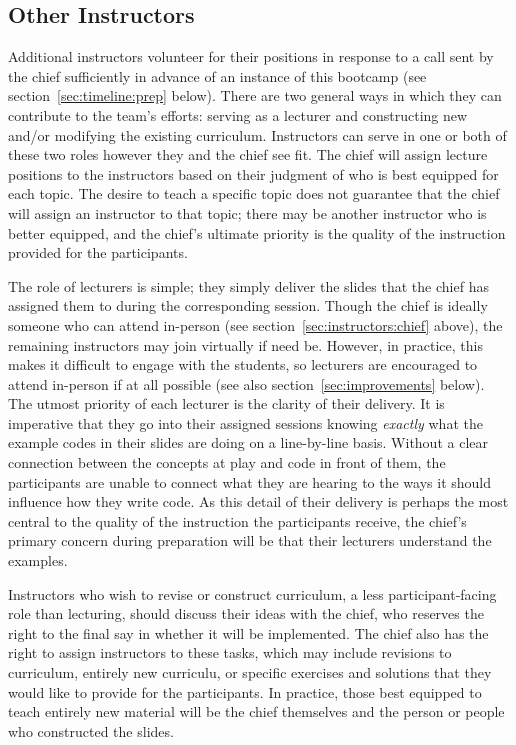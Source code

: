 \subsection{Other Instructors}
\label{sec:instructors:others}
\noindent
Additional instructors volunteer for their positions in response to a call sent
by the chief sufficiently in advance of an instance of this bootcamp (see
section~\ref{sec:timeline:prep} below).
There are two general ways in which they can contribute to the team's efforts:
serving as a lecturer and constructing new and/or modifying the existing
curriculum.
Instructors can serve in one or both of these two roles however they and the
chief see fit.
The chief will assign lecture positions to the instructors based on their
judgment of who is best equipped for each topic.
The desire to teach a specific topic does not guarantee that the chief will
assign an instructor to that topic; there may be another instructor who is
better equipped, and the chief's ultimate priority is the quality of the
instruction provided for the participants.
\par
The role of lecturers is simple; they simply deliver the slides that the chief
has assigned them to during the corresponding session.
Though the chief is ideally someone who can attend in-person (see
section~\ref{sec:instructors:chief} above), the remaining instructors may join
virtually if need be.
However, in practice, this makes it difficult to engage with the students, so
lecturers are encouraged to attend in-person if at all possible (see also
section~\ref{sec:improvements} below).
The utmost priority of each lecturer is the clarity of their delivery.
It is imperative that they go into their assigned sessions knowing
\textit{exactly} what the example codes in their slides are doing on a
line-by-line basis.
Without a clear connection between the concepts at play and code in front of
them, the participants are unable to connect what they are hearing to the ways
it should influence how they write code.
As this detail of their delivery is perhaps the most central to the quality of
the instruction the participants receive, the chief's primary concern during
preparation will be that their lecturers understand the examples.
\par
Instructors who wish to revise or construct curriculum, a less
participant-facing role than lecturing, should discuss their ideas with the
chief, who reserves the right to the final say in whether it will be
implemented.
The chief also has the right to assign instructors to these tasks, which may
include revisions to curriculum, entirely new curriculu, or specific exercises
and solutions that they would like to provide for the participants.
In practice, those best equipped to teach entirely new material will be the
chief themselves and the person or people who constructed the slides.




